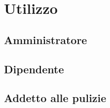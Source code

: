 \section{Utilizzo}

\subsection{Amministratore}

\subsection{Dipendente}

\subsection{Addetto alle pulizie}